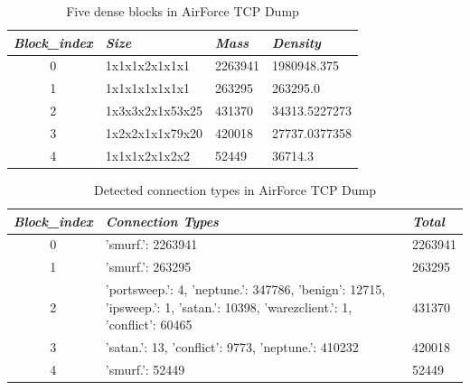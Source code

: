 \renewcommand{\arraystretch}{1.2}
\begin{table}[!ht]
\centering
\caption{Five dense blocks in AirForce TCP Dump}
\label{tab:airforce_t4.1}
\begin{tabular}{|c|p{3.5cm}|p{2cm}|p{3cm}|}
\hline
\textit{\textbf{Block\_index}} & \textit{\textbf{Size}} & \textit{\textbf{Mass}} & \textit{\textbf{Density}} \\ \hline
{0}    & 1x1x1x2x1x1x1                & 2263941                              & 1980948.375           \\ \hline
{1}    & 1x1x1x1x1x1x1                & 263295                               & 263295.0              \\ \hline
{2}    & 1x3x3x2x1x53x25              & 431370                               & 34313.5227273        \\ \hline
{3}    & 1x2x2x1x1x79x20              & 420018                               & 27737.0377358        \\ \hline
{4}    & 1x1x1x2x1x2x2                & 52449                                & 36714.3             \\ \hline
\end{tabular}
\end{table}

\renewcommand{\arraystretch}{1.2}
\begin{table}[!ht]
\centering
\caption{Detected connection types in AirForce TCP Dump}
\label{tab:airforce_t4.2}
\begin{tabular}{|c|p{11cm}|p{2cm}|}
\hline
\textit{\textbf{Block\_index}} & \textit{\textbf{Connection Types}}  & \textit{\textbf{Total}} \\ \hline
{0}    & {'smurf.': 2263941}                & 2263941                               \\ \hline
{1}    & {'smurf.': 263295}                 & 263295                                \\ \hline
{2}    & {'portsweep.': 4, 'neptune.': 347786, 'benign': 12715, 'ipsweep.': 1, 'satan.': 10398, 'warezclient.': 1, 'conflict': 60465}                 & 431370                             \\ \hline
{3}    & {'satan.': 13, 'conflict': 9773, 'neptune.': 410232}            & 420018    \\ \hline
{4}    & {'smurf.': 52449}                 & 52449                                   \\ \hline
\end{tabular}
\end{table}

